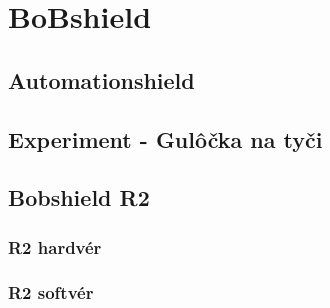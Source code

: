 \chapter{BoBshield}
\label{kap:1}

\section{Automationshield}
\label{kap1.1}


\section{Experiment - Gulôčka na tyči}
\label{kap:1.2}


\section{Bobshield R2}
\label{kap:1.3}


\subsection{R2 hardvér}
\label{kap:1.3.1}


\subsection{R2 softvér}
\label{kap:1.3.2}


